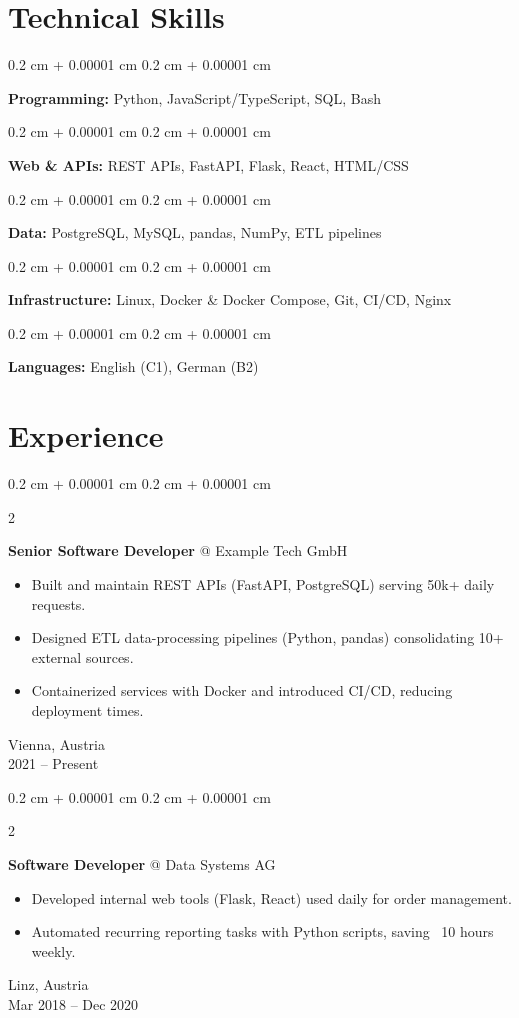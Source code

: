 \documentclass[9pt, letterpaper]{article}
\newenvironment{highlights}{
    \begin{itemize}[
        topsep=0.10 cm,
        parsep=0.10 cm,
        partopsep=0pt,
        itemsep=0pt,
        leftmargin=0.4 cm + 10pt
    ]
}{
    \end{itemize}
}
\newenvironment{onecolentry}{
    \begin{adjustwidth}{
        0.2 cm + 0.00001 cm
    }{
        0.2 cm + 0.00001 cm
    }
}{
    \end{adjustwidth}
}
\newenvironment{twocolentry}[2][]{
    \onecolentry
    \def\secondColumn{#2}
    \setcolumnwidth{\fill, 4.5 cm}
    \begin{paracol}{2}
}{
    \switchcolumn \raggedleft \secondColumn
    \end{paracol}
    \endonecolentry
}
\begin{document}
    \section{Technical Skills}
        \begin{onecolentry}
            \textbf{Programming:} Python, JavaScript/TypeScript, SQL, Bash
        \end{onecolentry}
        \begin{onecolentry}
            \textbf{Web \& APIs:} REST APIs, FastAPI, Flask, React, HTML/CSS
        \end{onecolentry}
        \begin{onecolentry}
            \textbf{Data:} PostgreSQL, MySQL, pandas, NumPy, ETL pipelines
        \end{onecolentry}
        \begin{onecolentry}
            \textbf{Infrastructure:} Linux, Docker \& Docker Compose, Git, CI/CD, Nginx
        \end{onecolentry}
        \begin{onecolentry}
            \textbf{Languages:} English (C1), German (B2)
        \end{onecolentry}

    \section{Experience}

        \begin{twocolentry}{
            Vienna, Austria \\
            2021 -- Present
        }
            \textbf{Senior Software Developer} @ Example Tech GmbH
            \begin{highlights}
                \item Built and maintain REST APIs (FastAPI, PostgreSQL) serving 50k+ daily requests.
                \item Designed ETL data-processing pipelines (Python, pandas) consolidating 10+ external sources.
                \item Containerized services with Docker and introduced CI/CD, reducing deployment times.
            \end{highlights}
        \end{twocolentry}

        \vspace{0.2 cm}

        \begin{twocolentry}{
            Linz, Austria \\
            Mar 2018 -- Dec 2020
        }
            \textbf{Software Developer} @ Data Systems AG
            \begin{highlights}
                \item Developed internal web tools (Flask, React) used daily for order management.
                \item Automated recurring reporting tasks with Python scripts, saving ~10 hours weekly.
            \end{highlights}
        \end{twocolentry}
\end{document}
